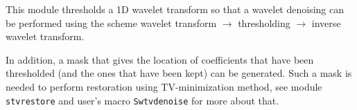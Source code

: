 This module thresholds a 1D wavelet transform so that a 
wavelet denoising can be performed using the scheme 
wavelet transform $\rightarrow$ thresholding $\rightarrow$ inverse wavelet transform.

In addition, a mask that gives the location of coefficients
that have been thresholded (and the ones that have been kept) can be
generated. Such a mask is needed to perform restoration using TV-minimization
method, see module {\tt stvrestore} and user's macro {\tt Swtvdenoise} for
more about that.

